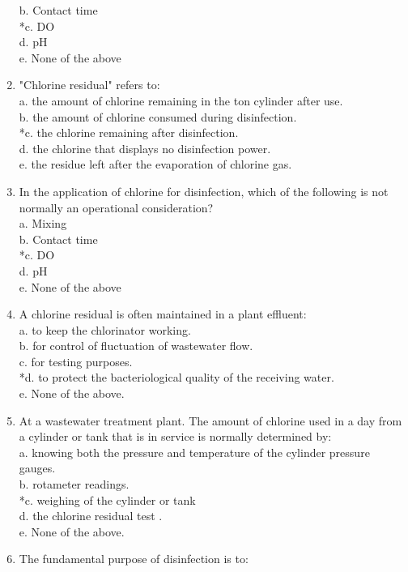\begin{enumerate}
b. Contact time \\
*c. DO \\
d. pH \\
e. None of the above \\
\item "Chlorine residual" refers to: \\
a. the amount of chlorine remaining in the ton cylinder after use. \\
b. the amount of chlorine consumed during disinfection. \\
*c. the chlorine remaining after disinfection. \\
d. the chlorine that displays no disinfection power. \\
e. the residue left after the evaporation of chlorine gas. \\
\item In the application of chlorine for disinfection, which of the following is not normally an operational consideration? \\
a. Mixing \\
b. Contact time \\
*c. DO \\
d. pH \\
e. None of the above \\
\item A chlorine residual is often maintained in a plant effluent: \\
a. to keep the chlorinator working. \\
b. for control of fluctuation of wastewater flow. \\
c. for testing purposes. \\
*d. to protect the bacteriological quality of the receiving water. \\
e. None of the above. \\
\item At a wastewater treatment plant. The amount of chlorine used in a day from a cylinder or tank that is in service is normally determined by: \\
a. knowing both the pressure and temperature of the cylinder pressure gauges. \\
b. rotameter readings. \\
*c. weighing of the cylinder or tank \\
d. the chlorine residual test . \\
e. None of the above. \\
\item The fundamental purpose of disinfection is to: \\

\end{enumerate}
